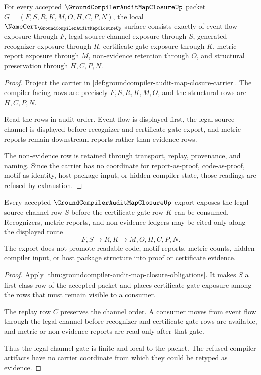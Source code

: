 \begin{theorem}
\label{thm:groundcompiler-audit-map-closure-obligations}
For every accepted $\GroundCompilerAuditMapClosureUp$ packet $G=(F,S,R,K,M,O,H,C,P,N)$, the local $\NameCert_{\GroundCompilerAuditMapClosureUp}$ surface consists exactly of event-flow exposure through $F$, legal source-channel exposure through $S$, generated recognizer exposure through $R$, certificate-gate exposure through $K$, metric-report exposure through $M$, non-evidence retention through $O$, and structural preservation through $H,C,P,N$.
\end{theorem}
\begin{proof}
Project the carrier in \autoref{def:groundcompiler-audit-map-closure-carrier}. The compiler-facing rows are precisely $F,S,R,K,M,O$, and the structural rows are $H,C,P,N$.

Read the rows in audit order. Event flow is displayed first, the legal source channel is displayed before recognizer and certificate-gate export, and metric reports remain downstream reports rather than evidence rows.

The non-evidence row is retained through transport, replay, provenance, and naming. Since the carrier has no coordinate for report-as-proof, code-as-proof, motif-as-identity, host package input, or hidden compiler state, those readings are refused by exhaustion.
\end{proof}

\begin{theorem}
\label{thm:groundcompiler-audit-map-legal-channel-gate}
Every accepted $\GroundCompilerAuditMapClosureUp$ export exposes the legal source-channel row $S$ before the certificate-gate row $K$ can be consumed. Recognizers, metric reports, and non-evidence ledgers may be cited only along the displayed route
$$
F,S \longmapsto R,K \longmapsto M,O,H,C,P,N .
$$
The export does not promote readable code, motif reports, metric counts, hidden compiler input, or host package structure into proof or certificate evidence.
\end{theorem}
\begin{proof}
Apply \autoref{thm:groundcompiler-audit-map-closure-obligations}. It makes $S$ a first-class row of the accepted packet and places certificate-gate exposure among the rows that must remain visible to a consumer.

The replay row $C$ preserves the channel order. A consumer moves from event flow through the legal channel before recognizer and certificate-gate rows are available, and metric or non-evidence reports are read only after that gate.

Thus the legal-channel gate is finite and local to the packet. The refused compiler artifacts have no carrier coordinate from which they could be retyped as evidence.
\end{proof}


